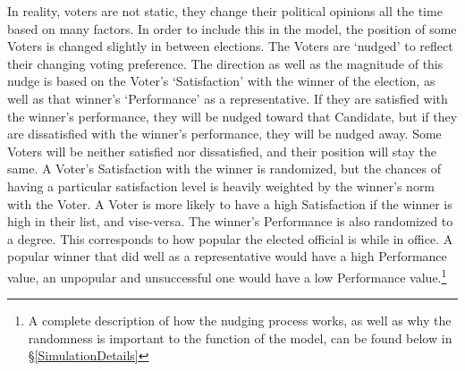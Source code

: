 \documentclass[12pt]{article}
\begin{document}
\qquad In reality, voters are not static, they change their political opinions all the time based on many factors. In order to include this in the model, the position of some Voters is changed slightly in between elections. The Voters are `nudged' to reflect their changing voting preference. The direction as well as the magnitude of this nudge is based on the Voter's `Satisfaction' with the winner of the election, as well as that winner's `Performance' as a representative. If they are satisfied with the winner's performance, they will be nudged toward that Candidate, but if they are dissatisfied with the winner's performance, they will be nudged away. Some Voters will be neither satisfied nor dissatisfied, and their position will stay the same. A Voter's Satisfaction with the winner is randomized, but the chances of having a particular satisfaction level is heavily weighted by the winner's norm with the Voter. A Voter is more likely to have a high Satisfaction if the winner is high in their list, and vise-versa. The winner's Performance is also randomized to a degree. This corresponds to how popular the elected official is while in office. A popular winner that did well as a representative would have a high Performance value, an unpopular and unsuccessful one would have a low Performance value.\footnote{A complete description of how the nudging process works, as well as why the randomness is important to the function of the model, can be found below in \S \ref{SimulationDetails}} \\

\end{document}
